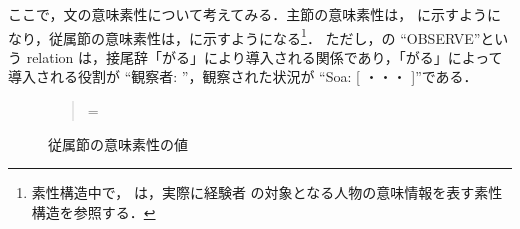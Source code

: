 ここで，文の意味素性について考えてみる．主節の意味素性は，
に示すようになり，従属節の意味素性は，に示すようになる\footnote{素性構造中で， は，実際に経験者
の対象となる人物の意味情報を表す素性構造を参照する．}．
ただし，の ``OBSERVE''という relation は，\hspace{0.05mm}接尾辞「がる」により導入される関係であり，「がる」\hspace{0.05mm}に\hspace{0.05mm}よ\hspace{0.05mm}っ\hspace{0.05mm}て\hspace{0.05mm}導\hspace{0.05mm}入\hspace{0.05mm}さ\hspace{0.05mm}れ\hspace{0.05mm}る\hspace{0.05mm}役\hspace{0.05mm}割\hspace{0.05mm}が
``観察者: ''，観察された状況が ``Soa: [ ・\hspace{-.5em}・\hspace{-.5em}・ ]''である．
\newsavebox{\myboxa}
\begin{figure}[htbp]
\footnotesize
\begin{quote}
=
\end{quote}
\caption{従属節の意味素性の値}
\end{figure}

